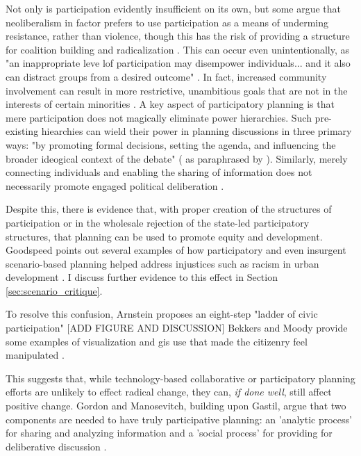 Not only is participation evidently insufficient on its own, but some argue that neoliberalism in factor prefers to use participation as a means of underming resistance, rather than violence, though this has the risk of providing a structure for coalition building and radicalization \cite{miraftabInsurgentPlanningSituating2016}. This can occur even unintentionally, as "an inappropriate leve lof participation may disempower individuals... and it also can distract groups from a desired outcome" \cite{sieberPublicParticipationGeographic2006}. In fact, increased community involvement can result in more restrictive, unambitious goals that are not in the interests of certain minorities \cite{wheatonIdentifyingPublicInterest1972}. A key aspect of participatory planning is that mere participation does not magically eliminate power hierarchies. Such pre-existing hiearchies can wield their power in planning discussions in 
three primary ways: "by promoting formal decisions, setting the agenda, and influencing the broader ideogical context of the debate" (\cite{foresterPlanningFacePower2001} as paraphrased by \cite{goodspeedScenarioPlanningCities2020}). Similarly, merely connecting individuals and enabling the sharing of information does not necessarily promote engaged political deliberation \cite{gordonAugmentedDeliberationMerging2011}.

Despite this, there is evidence that, with proper creation of the structures of participation or in the wholesale rejection of the state-led participatory structures, that planning can be used to promote equity and development. Goodspeed points out several examples of how participatory and even insurgent scenario-based planning helped address injustices such as racism in urban development \cite{goodspeedScenarioPlanningCities2020}. I discuss further evidence to this effect in Section \ref{sec:scenario_critique}.

To resolve this confusion, Arnstein proposes an eight-step "ladder of civic participation" \cite{arnsteinLadderCitizenParticipation1969} [ADD FIGURE AND DISCUSSION] Bekkers and Moody provide some examples of visualization and \ac{gis} use that made the citizenry feel manipulated \cite{bekkersVisualEventsElectronic2011}. 

This suggests that, while technology-based collaborative or participatory planning efforts are unlikely to effect radical change, they can, \textit{if done well}, still affect positive change. Gordon and Manosevitch, building upon Gastil, argue that two components are needed to have truly participative planning: an 'analytic process' for sharing and analyzing information and a 'social process' for providing for deliberative discussion \cite{gordonAugmentedDeliberationMerging2011}. 

